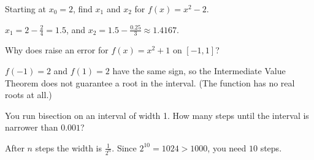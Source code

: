 \begin{Exercise}[label=rootfind2, title=One Newton step]
Starting at $x_0 = 2$, find $x_1$ and $x_2$ for $f(x) = x^2 - 2$.
\end{Exercise}
\begin{Answer}[ref=rootfind2]
$x_1 = 2 - \frac{2}{4} = 1.5$, and $x_2 = 1.5 - \frac{0.25}{3} \approx 1.4167$.
\end{Answer}

\begin{Exercise}[label=rootfind3, title=No sign change]
Why does  raise an error for $f(x) = x^2 + 1$ on $[-1, 1]$?
\end{Exercise}
\begin{Answer}[ref=rootfind3]
$f(-1) = 2$ and $f(1) = 2$ have the same sign, so the Intermediate Value Theorem
does not guarantee a root in the interval. (The function has no real roots at all.)
\end{Answer}

\begin{Exercise}[label=rootfind4, title=How many halvings?]
You run bisection on an interval of width 1. How many steps until the interval
is narrower than $0.001$?
\end{Exercise}
\begin{Answer}[ref=rootfind4]
After $n$ steps the width is $\frac{1}{2^n}$. Since $2^{10} = 1024 > 1000$, you
need $10$ steps.
\end{Answer}

